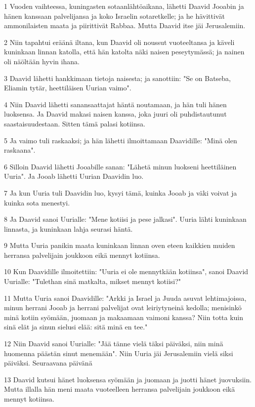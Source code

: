 \par 1 Vuoden vaihteessa, kuningasten sotaanlähtöaikana, lähetti Daavid Jooabin ja hänen kanssaan palvelijansa ja koko Israelin sotaretkelle; ja he hävittivät ammonilaisten maata ja piirittivät Rabbaa. Mutta Daavid itse jäi Jerusalemiin.
\par 2 Niin tapahtui eräänä iltana, kun Daavid oli noussut vuoteeltansa ja käveli kuninkaan linnan katolla, että hän katolta näki naisen peseytymässä; ja nainen oli näöltään hyvin ihana.
\par 3 Daavid lähetti hankkimaan tietoja naisesta; ja sanottiin: "Se on Batseba, Eliamin tytär, heettiläisen Uurian vaimo".
\par 4 Niin Daavid lähetti sanansaattajat häntä noutamaan, ja hän tuli hänen luoksensa. Ja Daavid makasi naisen kanssa, joka juuri oli puhdistautunut saastaisuudestaan. Sitten tämä palasi kotiinsa.
\par 5 Ja vaimo tuli raskaaksi; ja hän lähetti ilmoittamaan Daavidille: "Minä olen raskaana".
\par 6 Silloin Daavid lähetti Jooabille sanan: "Lähetä minun luokseni heettiläinen Uuria". Ja Jooab lähetti Uurian Daavidin luo.
\par 7 Ja kun Uuria tuli Daavidin luo, kysyi tämä, kuinka Jooab ja väki voivat ja kuinka sota menestyi.
\par 8 Ja Daavid sanoi Uurialle: "Mene kotiisi ja pese jalkasi". Uuria lähti kuninkaan linnasta, ja kuninkaan lahja seurasi häntä.
\par 9 Mutta Uuria panikin maata kuninkaan linnan oven eteen kaikkien muiden herransa palvelijain joukkoon eikä mennyt kotiinsa.
\par 10 Kun Daavidille ilmoitettiin: "Uuria ei ole mennytkään kotiinsa", sanoi Daavid Uurialle: "Tulethan sinä matkalta, mikset mennyt kotiisi?"
\par 11 Mutta Uuria sanoi Daavidille: "Arkki ja Israel ja Juuda asuvat lehtimajoissa, minun herrani Jooab ja herrani palvelijat ovat leiriytyneinä kedolla; menisinkö minä kotiin syömään, juomaan ja makaamaan vaimoni kanssa? Niin totta kuin sinä elät ja sinun sielusi elää: sitä minä en tee."
\par 12 Niin Daavid sanoi Uurialle: "Jää tänne vielä täksi päiväksi, niin minä huomenna päästän sinut menemään". Niin Uuria jäi Jerusalemiin vielä siksi päiväksi. Seuraavana päivänä
\par 13 Daavid kutsui hänet luoksensa syömään ja juomaan ja juotti hänet juovuksiin. Mutta illalla hän meni maata vuoteelleen herransa palvelijain joukkoon eikä mennyt kotiinsa.
